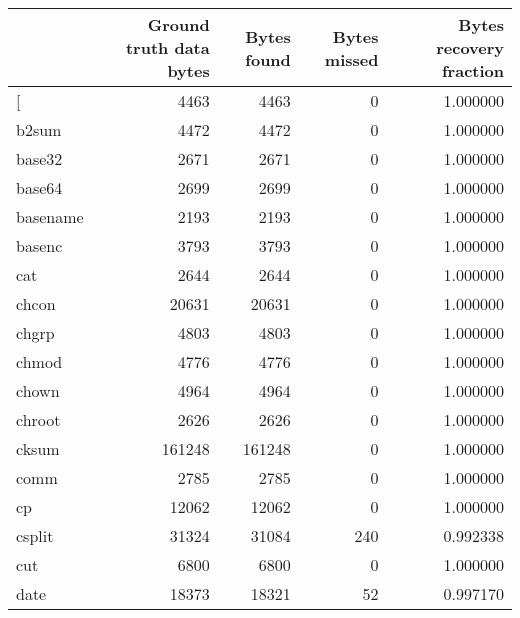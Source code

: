 \begin{tabular}{lrrrr}
\toprule
{} &  Ground truth data bytes &  Bytes found &  Bytes missed &  Bytes recovery fraction \\
\midrule
[         &                     4463 &         4463 &             0 &                 1.000000 \\
b2sum     &                     4472 &         4472 &             0 &                 1.000000 \\
base32    &                     2671 &         2671 &             0 &                 1.000000 \\
base64    &                     2699 &         2699 &             0 &                 1.000000 \\
basename  &                     2193 &         2193 &             0 &                 1.000000 \\
basenc    &                     3793 &         3793 &             0 &                 1.000000 \\
cat       &                     2644 &         2644 &             0 &                 1.000000 \\
chcon     &                    20631 &        20631 &             0 &                 1.000000 \\
chgrp     &                     4803 &         4803 &             0 &                 1.000000 \\
chmod     &                     4776 &         4776 &             0 &                 1.000000 \\
chown     &                     4964 &         4964 &             0 &                 1.000000 \\
chroot    &                     2626 &         2626 &             0 &                 1.000000 \\
cksum     &                   161248 &       161248 &             0 &                 1.000000 \\
comm      &                     2785 &         2785 &             0 &                 1.000000 \\
cp        &                    12062 &        12062 &             0 &                 1.000000 \\
csplit    &                    31324 &        31084 &           240 &                 0.992338 \\
cut       &                     6800 &         6800 &             0 &                 1.000000 \\
date      &                    18373 &        18321 &            52 &                 0.997170 \\

\end{tabular}
